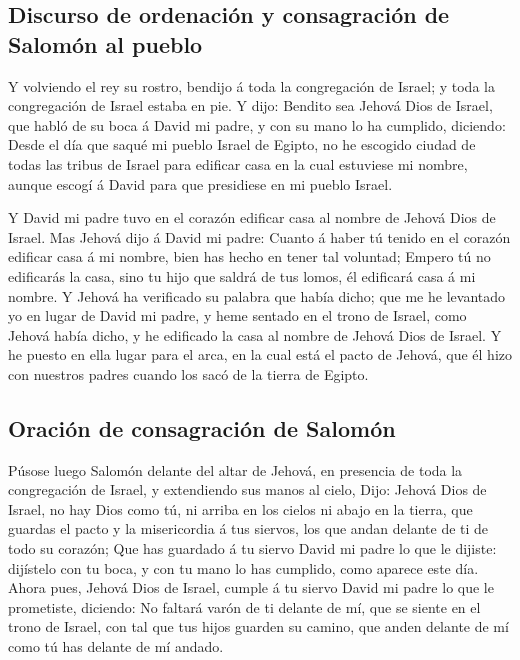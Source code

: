 \hypertarget{discurso-de-ordenaciuxf3n-y-consagraciuxf3n-de-salomuxf3n-al-pueblo}{%
\subsection{Discurso de ordenación y consagración de Salomón al
pueblo}\label{discurso-de-ordenaciuxf3n-y-consagraciuxf3n-de-salomuxf3n-al-pueblo}}

 Y volviendo el rey su rostro, bendijo á toda la
congregación de Israel; y toda la congregación de Israel estaba en pie.
 Y dijo: Bendito sea Jehová Dios de Israel, que habló de su
boca á David mi padre, y con su mano lo ha cumplido, diciendo:
 Desde el día que saqué mi pueblo Israel de Egipto, no he
escogido ciudad de todas las tribus de Israel para edificar casa en la
cual estuviese mi nombre, aunque escogí á David para que presidiese en
mi pueblo Israel.

 Y David mi padre tuvo en el corazón edificar casa al
nombre de Jehová Dios de Israel.  Mas Jehová dijo á David
mi padre: Cuanto á haber tú tenido en el corazón edificar casa á mi
nombre, bien has hecho en tener tal voluntad;  Empero tú no
edificarás la casa, sino tu hijo que saldrá de tus lomos, él edificará
casa á mi nombre.  Y Jehová ha verificado su palabra que
había dicho; que me he levantado yo en lugar de David mi padre, y heme
sentado en el trono de Israel, como Jehová había dicho, y he edificado
la casa al nombre de Jehová Dios de Israel.  Y he puesto en
ella lugar para el arca, en la cual está el pacto de Jehová, que él hizo
con nuestros padres cuando los sacó de la tierra de Egipto.

\hypertarget{oraciuxf3n-de-consagraciuxf3n-de-salomuxf3n}{%
\subsection{Oración de consagración de
Salomón}\label{oraciuxf3n-de-consagraciuxf3n-de-salomuxf3n}}

 Púsose luego Salomón delante del altar de Jehová, en
presencia de toda la congregación de Israel, y extendiendo sus manos al
cielo,  Dijo: Jehová Dios de Israel, no hay Dios como tú,
ni arriba en los cielos ni abajo en la tierra, que guardas el pacto y la
misericordia á tus siervos, los que andan delante de ti de todo su
corazón;  Que has guardado á tu siervo David mi padre lo
que le dijiste: dijístelo con tu boca, y con tu mano lo has cumplido,
como aparece este día.  Ahora pues, Jehová Dios de Israel,
cumple á tu siervo David mi padre lo que le prometiste, diciendo: No
faltará varón de ti delante de mí, que se siente en el trono de Israel,
con tal que tus hijos guarden su camino, que anden delante de mí como tú
has delante de mí andado.

